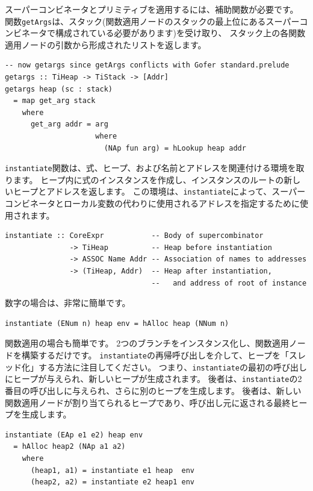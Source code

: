\documentclass{jbook}
\begin{document}
スーパーコンビネータとプリミティブを適用するには、補助関数が必要です。
関数\texttt{getArgs}は、スタック(関数適用ノードのスタックの最上位にあるスーパーコンビネータで構成されている必要があります)を受け取り、
スタック上の各関数適用ノードの引数から形成されたリストを返します。

\begin{verbatim}
-- now getargs since getArgs conflicts with Gofer standard.prelude
getargs :: TiHeap -> TiStack -> [Addr]
getargs heap (sc : stack)
  = map get_arg stack
    where
      get_arg addr = arg
                     where
                       (NAp fun arg) = hLookup heap addr
\end{verbatim}

\texttt{instantiate}関数は、式、ヒープ、および名前とアドレスを関連付ける環境を取ります。
ヒープ内に式のインスタンスを作成し、インスタンスのルートの新しいヒープとアドレスを返します。
この環境は、\texttt{instantiate}によって、スーパーコンビネータとローカル変数の代わりに使用されるアドレスを指定するために使用されます。

\begin{verbatim}
instantiate :: CoreExpr           -- Body of supercombinator
               -> TiHeap          -- Heap before instantiation
               -> ASSOC Name Addr -- Association of names to addresses
               -> (TiHeap, Addr)  -- Heap after instantiation,
                                  --   and address of root of instance
\end{verbatim}

数字の場合は、非常に簡単です。

\begin{verbatim}
instantiate (ENum n) heap env = hAlloc heap (NNum n)
\end{verbatim}

関数適用の場合も簡単です。 2つのブランチをインスタンス化し、関数適用ノードを構築するだけです。
\texttt{instantiate}の再帰呼び出しを介して、ヒープを「スレッド化」する方法に注目してください。
つまり、\texttt{instantiate}の最初の呼び出しにヒープが与えられ、新しいヒープが生成されます。
後者は、\texttt{instantiate}の2番目の呼び出しに与えられ、さらに別のヒープを生成します。
後者は、新しい関数適用ノードが割り当てられるヒープであり、呼び出し元に返される最終ヒープを生成します。

\begin{verbatim}
instantiate (EAp e1 e2) heap env
  = hAlloc heap2 (NAp a1 a2)
    where
      (heap1, a1) = instantiate e1 heap  env
      (heap2, a2) = instantiate e2 heap1 env
\end{verbatim}
\end{document}
